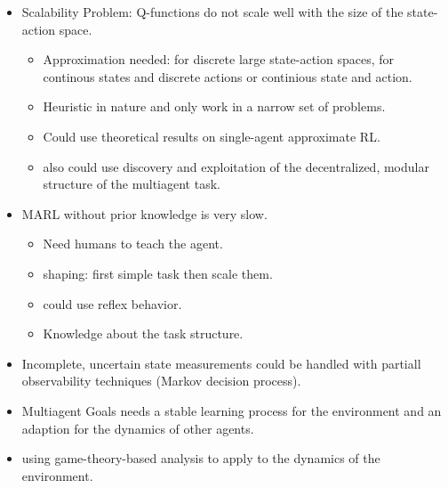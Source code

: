 \begin{itemize}[noitemsep,nolistsep]
	\item Scalability Problem: Q-functions do not scale well with the size of the state-action space.
	\begin{itemize}[noitemsep,nolistsep]
		\item Approximation needed: for discrete large state-action spaces, for continous states and discrete actions or continious state and action.
		\item Heuristic in nature and only work in a narrow set of problems.
		\item Could use theoretical results on single-agent approximate RL.
		\item also could use discovery and exploitation of the decentralized, modular structure of the multiagent task.
	\end{itemize}
	\item MARL without prior knowledge is very slow.
	\begin{itemize}[noitemsep,nolistsep]
		\item Need humans to teach the agent.
		\item shaping: first simple task then scale them.
		\item could use reflex behavior.
		\item Knowledge about the task structure.
	\end{itemize}
	\item Incomplete, uncertain state measurements could be handled with partiall observability techniques (Markov decision process).
	\item Multiagent Goals needs a stable learning process for the environment and an adaption for the dynamics of other agents.
	\item using game-theory-based analysis to apply to the dynamics of the environment.
\end{itemize}

